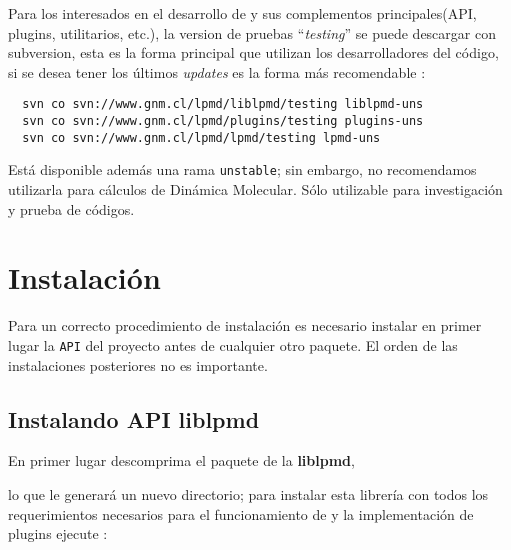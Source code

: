 Para los interesados en el desarrollo de {\lpmd} y sus complementos principales(API, plugins, utilitarios, etc.), la version de pruebas ``\textit{testing}'' se puede descargar con subversion, esta es la forma principal que utilizan los desarrolladores del c\'odigo, si se desea tener los \'ultimos \textit{updates} es la forma m\'as recomendable :

\begin{center}
 \begin{verbatim}
  svn co svn://www.gnm.cl/lpmd/liblpmd/testing liblpmd-uns
  svn co svn://www.gnm.cl/lpmd/plugins/testing plugins-uns
  svn co svn://www.gnm.cl/lpmd/lpmd/testing lpmd-uns
 \end{verbatim}
\end{center}

Est\'a disponible adem\'as una rama \verb|unstable|; sin embargo, no recomendamos utilizarla para c\'alculos de Din\'amica Molecular. S\'olo utilizable para investigaci\'on y prueba de c\'odigos.

\section{Instalaci\'on}

Para un correcto procedimiento de instalaci\'on es necesario instalar en primer lugar la \verb|API| del proyecto antes de cualquier otro paquete. El orden de las instalaciones posteriores no es importante.


\subsection{Instalando API liblpmd}

En primer lugar descomprima el paquete de la \textbf{liblpmd},


lo que le generar\'a un nuevo directorio; para instalar esta librer\'ia con todos los requerimientos necesarios para el funcionamiento de {\lpmd} y la implementaci\'on de plugins ejecute :

